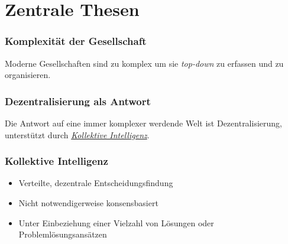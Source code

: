 \section{Zentrale Thesen}
\begin{frame}[label=complexity]
	\frametitle{Komplexität der Gesellschaft}
	Moderne Gesellschaften sind zu komplex um sie \textit{top-down} zu erfassen und zu organisieren.
\end{frame}


\begin{frame}[label=decentral]
	\frametitle{Dezentralisierung als Antwort}

	Die Antwort auf eine immer komplexer werdende Welt ist Dezentralisierung, unterstützt durch \hyperlink{collective_intel}{\textit{Kollektive Intelligenz}}.
\end{frame}

\begin{frame}[label=collective_intel]
	\frametitle{Kollektive Intelligenz}
	\begin{itemize}
		\item
			Verteilte, dezentrale Entscheidungsfindung
		\item
			Nicht notwendigerweise konsensbasiert
		\item
			Unter Einbeziehung einer Vielzahl von Lösungen oder Problemlösungsansätzen
	\end{itemize}
\end{frame}




